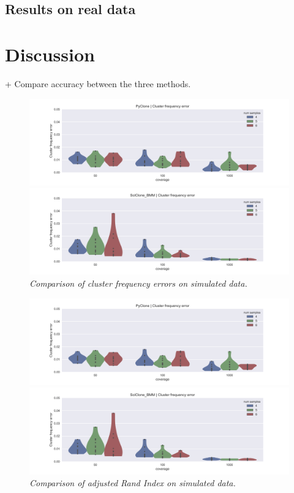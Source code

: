 \documentclass[11pt]{article}
\begin{document}
\subsection{Results on real data}

\section{Discussion}
+ Compare accuracy between the three methods.

\begin{figure}[h]
\centerline{\includegraphics[scale=0.75]{PyClone_cluster_frequency_plot.png}}
\centerline{\includegraphics[scale=0.75]{SciClone_cluster_freq_error_plot.png}}
\caption{\emph{Comparison of cluster frequency errors on simulated data.}}
\label{fig:Heterogeneity}
\end{figure}

\newpage
\begin{figure}[h]
\centerline{\includegraphics[scale=0.75]{PyClone_ARI.png}}
\centerline{\includegraphics[scale=0.75]{SciClone_ARI.png}}
\caption{\emph{Comparison of adjusted Rand Index on simulated data.}}
\label{fig:Heterogeneity}
\end{figure}
\end{document}
